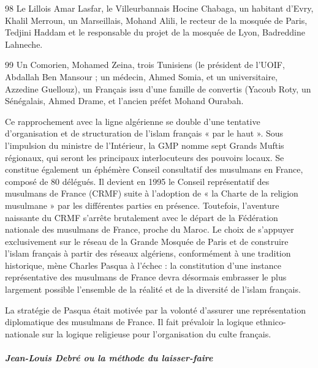 98 Le Lillois Amar Lasfar, le Villeurbannais Hocine Chabaga, un habitant
d'Evry, Khalil Merroun, un Marseillais, Mohand Alili, le recteur de la
mosquée de Paris, Tedjini Haddam et le responsable du projet de la
mosquée de Lyon, Badreddine Lahneche.

99 Un Comorien, Mohamed Zeina, trois Tunisiens (le président de l'UOIF,
Abdallah Ben Mansour ; un médecin, Ahmed Somia, et un universitaire,
Azzedine Guellouz), un Français issu d'une famille de convertis (Yacoub
Roty, un Sénégalais, Ahmed Drame, et l'ancien préfet Mohand Ourabah.



Ce rapprochement avec la ligne algérienne se double d'une tentative
d'organisation et de structuration de l'islam français « par le haut ».
Sous l'impulsion du ministre de l'Intérieur, la GMP nomme sept Grands
Muftis régionaux, qui seront les principaux interlocuteurs des pouvoirs
locaux. Se constitue également un éphémère Conseil consultatif des
musulmans en France, composé de 80 délégués. Il devient en 1995 le
Conseil représentatif des musulmans de France (CRMF) suite à l'adoption
de « la Charte de la religion musulmane » par les différentes parties en
présence. Toutefois, l'aventure naissante du CRMF s'arrête brutalement
avec le départ de la Fédération nationale des musulmans de France,
proche du Maroc. Le choix de s'appuyer exclusivement sur le réseau de la
Grande Mosquée de Paris et de construire l'islam français à partir des
réseaux algériens, conformément à une tradition historique, mène Charles
Pasqua à l'échec : la constitution d'une instance représentative des
musulmans de France devra désormais embrasser le plus largement possible
l'ensemble de la réalité et de la diversité de l'islam français.

La stratégie de Pasqua était motivée par la volonté d'assurer une
représentation diplomatique des musulmans de France. Il fait prévaloir
la logique ethnico-nationale sur la logique religieuse pour
l'organisation du culte français.


\hypertarget{jean-louis-debruxe9-ou-la-muxe9thode-du-laisser-faire}{%
\subparagraph{Jean-Louis Debré ou la méthode du
laisser-faire}\label{jean-louis-debruxe9-ou-la-muxe9thode-du-laisser-faire}}


